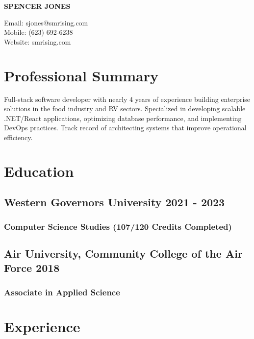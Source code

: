 \documentclass[11pt]{article} %
\begin{document}
\begin{center}
	\begin{minipage}{0.55\textwidth}
		{\Huge\bfseries SPENCER JONES}
	\end{minipage}
	\begin{minipage}{0.4\textwidth}
		\raggedleft
		Email: sjones@smrising.com \\
		Mobile: (623) 692-6238 \\
        Website: smrising.com \\
	\end{minipage} \hfill
\end{center}

\section{Professional Summary}
\noindent Full-stack software developer with nearly 4 years of experience building enterprise solutions in the food industry and RV sectors. Specialized in developing scalable .NET/React applications, optimizing database performance, and implementing DevOps practices. Track record of architecting systems that improve operational efficiency.

\section{Education}
\subsection{Western Governors University \hfill 2021 - 2023}
\subsubsection{Computer Science Studies (107/120 Credits Completed)}
\subsection{Air University, Community College of the Air Force \hfill 2018} 
\subsubsection{Associate in Applied Science}
\vspace{0.7em}
\section{Experience}
\end{document}
